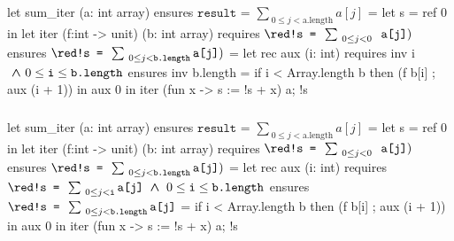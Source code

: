 \begin{frame}[fragile]
\frametitle{}
\vspace*{0em}
\begin{footnotesize}
\begin{whycode}
let sum_iter (a: int array) 
ensures { $\texttt{result = }\sum_{~0 \leq j < \text{a.length}} a[j]$ }
= let s = ref 0 in 
  let iter (f:int -> unit) (b: int array)
  requires { ${\red \texttt{!s = } \sum_{~0\leq j < 0} \texttt{ a[j]})}$ } 
  ensures  { ${\red \texttt{!s = } \sum_{~0\leq j < \texttt{b.length}} \texttt{a[j]}})$ } 
  = let rec aux (i: int)
    requires { inv i$\boldsymbol{~\wedge~} 0 \leq \texttt{i} \leq \texttt{b.length}$ }
    ensures  { inv b.length }
    = if i < Array.length b
      then (f b[i] ; aux (i + 1)) 
    in aux 0
  in iter (fun x -> s := !s + x) a; 
  !s
\end{whycode}
\end{footnotesize}
\end{frame}
\addtocounter{framenumber}{-1}



\begin{frame}[fragile]
\frametitle{}
\vspace*{0em}
\begin{footnotesize}
\begin{whycode}
let sum_iter (a: int array) 
ensures { $\texttt{result = }\sum_{~0 \leq j < \text{a.length}} a[j]$ }
= let s = ref 0 in 
  let iter (f:int -> unit) (b: int array)
  requires { ${\red \texttt{!s = } \sum_{~0\leq j < 0} \texttt{ a[j]})}$ } 
  ensures  { ${\red \texttt{!s = } \sum_{~0\leq j < \texttt{b.length}} \texttt{a[j]}})$ } 
  = let rec aux (i: int)
    requires { ${\red \texttt{!s = } \sum_{~0\leq j < \texttt{i}} \texttt{a[j]}} \bwedge 0 \leq \texttt{i} \leq \texttt{b.length}$ }
    ensures  { ${\red \texttt{!s = } \sum_{~0\leq j < \texttt{b.length}} \texttt{a[j]}}$ }
    = if i < Array.length b
      then (f b[i] ; aux (i + 1)) 
    in aux 0
  in iter (fun x -> s := !s + x) a; 
  !s
\end{whycode}
\end{footnotesize}
\end{frame}
\addtocounter{framenumber}{-1}

